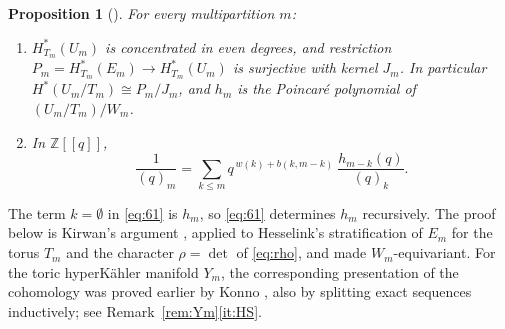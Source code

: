 \documentclass[11pt]{amsart}
\newtheorem{proposition}[theorem]{Proposition}
\theoremstyle{definition}
\theoremstyle{remark}
\numberwithin{equation}{section}
\newcommand{\Z}{\mathbb{Z}}
\begin{document}
\begin{proposition}[{\cite[Proposition~6.2 and (6.2)]{Hik}}]\label{prop:62}
For every multipartition $m$:
\begin{enumerate}[label=(\alph*),leftmargin=2em]
\item\label{62:a} $H^*_{T_m}(U_m)$ is concentrated in even degrees, and restriction
$P_m=H^*_{T_m}(E_m)\to H^*_{T_m}(U_m)$ is surjective with kernel $J_m$. In particular
$H^*(U_m/T_m)\cong P_m/J_m$, and $h_m$ is the Poincar\'e polynomial of $(U_m/T_m)/W_m$.
\item\label{62:b} In $\Z[[q]]$,
\begin{equation}\label{eq:61}
  \frac1{(q)_m}=\sum_{k\le m} q^{\,w(k)+b(k,m-k)}\ \frac{h_{m-k}(q)}{(q)_k}. \tag{6.1}
\end{equation}
\end{enumerate}
\end{proposition}

The term $k=\emptyset$ in \eqref{eq:61} is $h_m$, so \eqref{eq:61} determines $h_m$ recursively. The
proof below is Kirwan's argument \cite{Kir}, applied to Hesselink's stratification of $E_m$ for the torus
$T_m$ and the character $\rho=\det$ of \eqref{eq:rho}, and made $W_m$-equivariant. For the toric
hyperK\"ahler manifold $Y_m$, the corresponding presentation of the cohomology was proved earlier by
Konno \cite[Theorem~3.1]{Kon00}, also by splitting exact sequences inductively; see
Remark~\ref{rem:Ym}\ref{it:HS}.
\end{document}
